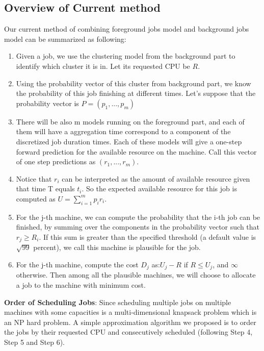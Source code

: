 \documentclass{article}
\begin{document}
\subsection{Overview of Current method}
\begin{flushleft}
Our current method of combining foreground jobs model and background jobs model
can be summarized as following:

\begin{enumerate}[Step 1:]
    \item Given a job, we use the clustering model from the background part to
    identify which cluster it is in. Let its requested CPU be $R$.
    \item Using the probability vector of this cluster from background part, we
    know the probability of this job finishing at different times. Let's suppose
    that the probability vector is $P = (p_{1}, ..., p_{m})$
    \item There will be also m models running on the foreground part, and each
    of them will have a aggregation time correspond to a component of the
    discretized job duration times. Each of these models will give a one-step
    forward prediction for the available resource on the machine. Call this
    vector of one step predictions as $(r_1, ... , r_m)$.
    \item Notice that $r_i$ can be interpreted as the amount of available
    resource given that time T equals $t_i$. So the expected available resource
    for this job is computed as $U = \sum_{i=1}^{m} p_i r_i$.
    \item For the j-th machine, we can compute the probability that the i-th job
    can be finished, by summing over the components in the probability vector
    such that $r_j \geq R_i$. If this sum is greater than the specified
    threshold (a default value is $\sqrt{99}$ percent), we call this machine is
    plausible for the job. 
    \item For the j-th machine, compute the cost $D_j$ as:$U_j - R$ if $R \leq
    U_j$, and $\infty$ otherwise. Then among all the plausible machines, we will
    choose to allocate a job to the machine with minimum cost.
\end{enumerate}

\textbf{Order of Scheduling Jobs}: Since scheduling multiple jobs on multiple
machines with some capacities is a multi-dimensional knapsack problem which is
an NP hard problem. A simple approximation algorithm we proposed is to order the
jobs by their requested CPU and consecutively scheduled (following Step 4, Step
5 and Step 6).


\end{flushleft}
\end{document}
